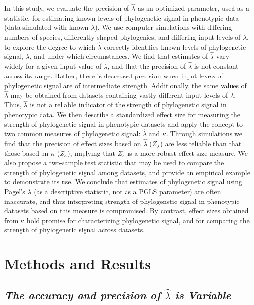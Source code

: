 \documentclass[
]{article}
\begin{document}
In this study, we evaluate the precision of \(\hat{\lambda}\) as an
optimized parameter, used as a statistic, for estimating known levels of
phylogenetic signal in phenotypic data (data simulated with known
\(\lambda\)). We use computer simulations with differing numbers of
species, differently shaped phylogenies, and differing input levels of
\(\lambda\), to explore the degree to which \(\hat{\lambda}\) correctly
identifies known levels of phylogenetic signal, \(\lambda\), and under
which circumstances. We find that estimates of \(\hat{\lambda}\) vary
widely for a given input value of \(\lambda\), and that the precision of
\(\hat{\lambda}\) is not constant across its range. Rather, there is
decreased precision when input levels of phylogenetic signal are of
intermediate strength. Additionally, the same values of
\(\hat{\lambda}\) may be obtained from datasets containing vastly
different input levels of \(\lambda\). Thus, \(\hat{\lambda}\) is not a
reliable indicator of the strength of phylogenetic signal in phenotypic
data. We then describe a standardized effect size for measuring the
strength of phylogenetic signal in phenotypic datasets and apply the
concept to two common measures of phylogenetic signal: \(\hat{\lambda}\)
and \(\kappa\). Through simulations we find that the precision of effect
sizes based on \(\hat{\lambda}\) (\(Z_{\lambda}\)) are less reliable
than that those based on \(\kappa\) (\(Z_\kappa\)), implying that
\(Z_\kappa\) is a more robust effect size measure. We also propose a
two-sample test statistic that may be used to compare the strength of
phylogenetic signal among datasets, and provide an empirical example to
demonstrate its use. We conclude that estimates of phylogenetic signal
using Pagel's \(\lambda\) (as a descriptive statistic, not as a PGLS
parameter) are often inaccurate, and thus interpreting strength of
phylogenetic signal in phenotypic datasets based on this measure is
compromised. By contrast, effect sizes obtained from \(\kappa\) hold
promise for characterizing phylogenetic signal, and for comparing the
strength of phylogenetic signal across datasets.

\hypertarget{methods-and-results}{%
\section{Methods and Results}\label{methods-and-results}}

\hypertarget{the-accuracy-and-precision-of-hatlambda-is-variable}{%
\subsection{\texorpdfstring{\emph{The accuracy and precision of
\(\hat{\lambda}\) is
Variable}}{The accuracy and precision of \textbackslash hat\{\textbackslash lambda\} is Variable}}\label{the-accuracy-and-precision-of-hatlambda-is-variable}}
\end{document}
